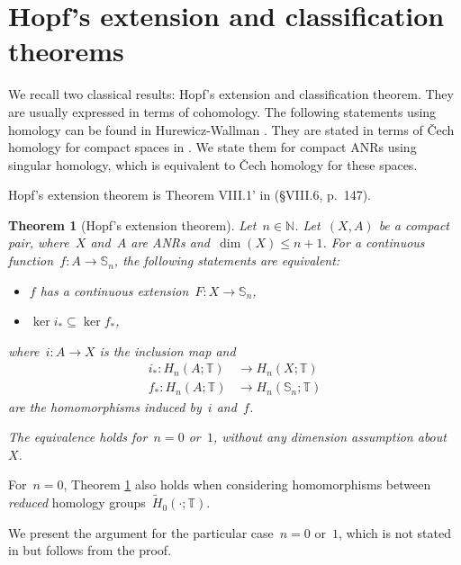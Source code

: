 \documentclass[english,11pt]{article}
\theoremstyle{plain}
\newtheorem{theorem}{Theorem}[section]
\theoremstyle{remark}
\theoremstyle{definition}
\newcommand{\Sp}{\mathbb{S}}
\newcommand{\R}{\mathbb{R}}
\newcommand{\Z}{\mathbb{Z}}
\newcommand{\N}{\mathbb{N}}
\newcommand{\RZ}{\mathbb{T}}%
\newcommand{\im}{\mathop{\mathrm{im}}}
\begin{document}
\section{Hopf's extension and classification theorems}\label{sec_hopf}

We recall two classical results: Hopf's extension and classification theorem. They are usually expressed in terms of cohomology. The following statements using homology can be found in Hurewicz-Wallman \cite{HurWal41}. They are stated in terms of \v{C}ech homology for compact spaces in \cite{HurWal41}. We state them for compact ANRs using singular homology, which is equivalent to \v{C}ech homology for these spaces.

Hopf's extension theorem is Theorem VIII.1' in \cite{HurWal41} (\S VIII.6, p.~147).

\begin{theorem}[Hopf's extension theorem]\label{thm_hopf_extension}Let~$n\in\N$. 
Let~$(X,A)$ be a compact pair, where~$X$ and~$A$ are ANRs and~$\dim(X)\leq n+1$. For a continuous function~$f:A\to\Sp_n$, the following statements are equivalent:
\begin{itemize}
\item $f$ has a continuous extension~$F:X\to\Sp_n$,
\item $\ker i_*\subseteq \ker f_*$,
\end{itemize}
where~$i:A\to X$ is the inclusion map and
\begin{align*}
i_*:H_n(A;\RZ)&\to H_n(X;\RZ)\\
f_*:H_n(A;\RZ)&\to H_n(\Sp_n;\RZ)
\end{align*}
are the homomorphisms induced by~$i$ and~$f$.

The equivalence holds for~$n=0$ or~$1$, without any dimension assumption about~$X$.
\end{theorem}
For~$n=0$, Theorem \ref{thm_hopf_extension} also holds when considering homomorphisms between \emph{reduced} homology groups~$\widetilde{H}_0(\cdot;\RZ)$.

We present the argument for the particular case~$n=0$ or~$1$, which is not stated in \cite{HurWal41} but follows from the proof.
\end{document}
